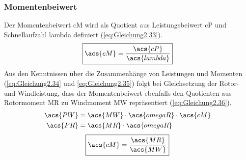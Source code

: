 \subsubsection{Momentenbeiwert}
Der Momentenbeiwert \acs{cM} wird als Quotient aus Leistungsbeiwert \acs{cP} und Schnellaufzahl \acs{lambda} definiert (\autoref{eq:Gleichung2.33}).
\begin{equation}\label{eq:Gleichung2.33}
    \boxed{\acs{cM} = \frac{\acs{cP}}{\acs{lambda}}}
\end{equation}
\newline
Aus den Kenntnissen über die Zusammenhänge von Leistungen und Momenten (\autoref{eq:Gleichung2.34} und \autoref{eq:Gleichung2.35}) folgt bei Gleichsetzung der Rotor- und Windleistung, dass der Momentenbeiwert ebenfalls den Quotienten aus Rotormoment \acs{MR} zu Windmoment \acs{MW} repräsentiert (\autoref{eq:Gleichung2.36}).
\begin{align}
    \acs{PW} &= \acs{MW} \cdot \acs{omegaR} \cdot \acs{cM} \label{eq:Gleichung2.34} \\
    \acs{PR} &= \acs{MR} \cdot \acs{omegaR} \label{eq:Gleichung2.35}
\end{align}
\begin{equation}\label{eq:Gleichung2.36}
    \boxed{\acs{cM} = \frac{\acs{MR}}{\acs{MW}}}
\end{equation}

